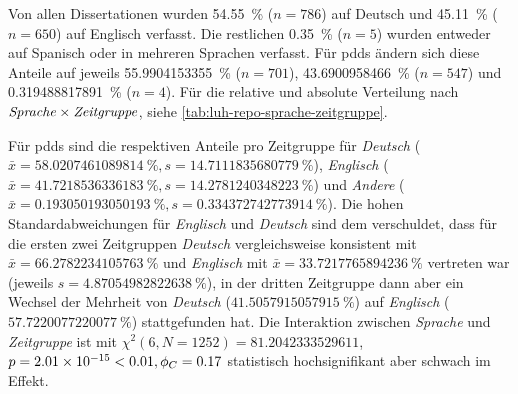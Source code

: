 Von allen Dissertationen wurden \SI[round-mode=places,round-precision=2]{54.55}{\percent} ($n=\num{786}$) auf Deutsch und \SI[round-mode=places,round-precision=2]{45,11}{\percent} ($n=\num{650}$) auf Englisch verfasst.
Die restlichen \SI[round-mode=places,round-precision=2]{0.35}{\percent} ($n=\num{5}$) wurden entweder auf Spanisch oder in mehreren Sprachen verfasst.
Für \glspl{pdd} ändern sich diese Anteile auf jeweils \SI[round-mode=places,round-precision=2]{55.9904153355}{\percent} ($n=\num{701}$), \SI[round-mode=places,round-precision=2]{43.6900958466}{\percent} ($n=\num{547}$) und \SI[round-mode=places,round-precision=2]{0.319488817891}{\percent} ($n=\num{4}$).
Für die relative und absolute Verteilung nach $\text{\textit{Sprache}}\times\text{\textit{Zeitgruppe}}$, siehe \cref{tab:luh-repo-sprache-zeitgruppe}.

Für \glspl{pdd} sind die respektiven Anteile pro Zeitgruppe für \textit{Deutsch} ($\bar{x}=\SI[round-mode=places,round-precision=2]{58.0207461089814}{\percent},s=\SI[round-mode=places,round-precision=2]{14.7111835680779}{\percent}$), \textit{Englisch} ($\bar{x}=\SI[round-mode=places,round-precision=2]{41.7218536336183}{\percent},s=\SI[round-mode=places,round-precision=2]{14.2781240348223}{\percent}$) und \textit{Andere} ($\bar{x}=\SI[round-mode=places,round-precision=2]{0.193050193050193}{\percent},s=\SI[round-mode=places,round-precision=2]{0.334372742773914}{\percent}$).
Die hohen Standardabweichungen für \textit{Englisch} und \textit{Deutsch} sind dem verschuldet, dass für die ersten zwei Zeitgruppen \textit{Deutsch} vergleichsweise konsistent mit $\bar{x}=\SI[round-mode=places,round-precision=2]{66.2782234105763}{\percent}$ und \textit{Englisch} mit $\bar{x}=\SI[round-mode=places,round-precision=2]{33.7217765894236}{\percent}$  vertreten war (jeweils $s=\SI[round-mode=places,round-precision=2]{4.87054982822638}{\percent}$), in der dritten Zeitgruppe dann aber ein Wechsel der Mehrheit von \textit{Deutsch} ($\SI[round-mode=places,round-precision=2]{41.5057915057915}{\percent}$) auf \textit{Englisch} ($\SI[round-mode=places,round-precision=2]{57.7220077220077}{\percent}$) stattgefunden hat.
Die Interaktion zwischen \textit{Sprache} und \textit{Zeitgruppe} ist mit $\chi^2 (\num{6}, N = \num{1252}) = \num[round-mode=places,round-precision=2]{81.2042333529611}$, $p = \num[round-mode=places,round-precision=2]{2.01454276715493E-15}<\num{0.01},\phi_C=\num[round-mode=places,round-precision=2]{0.16785811702362}$ statistisch hochsignifikant aber schwach im Effekt.

